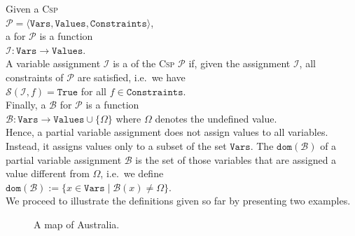 \noindent
Given a \textsc{Csp}
\\[0.2cm]
\hspace*{1.3cm}
 $\mathcal{P} = \langle \mathtt{Vars}, \mathtt{Values}, \mathtt{Constraints} \rangle$, 
\\[0.2cm]
a  for $\mathcal{P}$ is a function
\\[0.2cm]
\hspace*{1.3cm}
$\mathcal{I}: \mathtt{Vars} \rightarrow \mathtt{Values}$.
\\[0.2cm]
A variable assignment $\mathcal{I}$ is a  of the \textsc{Csp} $\mathcal{P}$ 
if, given the assignment $\mathcal{I}$, all constraints of $\mathcal{P}$ are satisfied, i.e.~we have
\\[0.2cm]
\hspace*{1.3cm}
$\mathcal{S}(\mathcal{I}, f) = \mathtt{True}$ \quad for all $f \in \mathtt{Constraints}$.
\\[0.2cm]
Finally, a  $\mathcal{B}$ for $\mathcal{P}$ is a function
\\[0.2cm]
\hspace*{1.3cm}
$\mathcal{B}: \mathtt{Vars} \rightarrow \mathtt{Values} \cup \{ \Omega \}$ \quad where $\Omega$ denotes the undefined value.
\\[0.2cm]
Hence, a partial variable assignment does not assign values to all variables.  Instead, it assigns values only
to a subset of the set $\mathtt{Vars}$.  The  $\mathtt{dom}(\mathcal{B})$ of a partial variable assignment $\mathcal{B}$ is the
set of those variables that are assigned a value different from $\Omega$, i.e.~we define
\\[0.2cm]
\hspace*{1.3cm}
$\mathtt{dom}(\mathcal{B}) := \bigl\{ x \in \mathtt{Vars} \mid \mathcal{B}(x) \not= \Omega \bigr\}$.
\\[0.2cm]
We proceed to illustrate the definitions given so far by presenting two examples.


\begin{figure}[!ht]
  \centering
  \caption{A map of Australia.}
  \label{fig:australia.pdf}
\end{figure}

